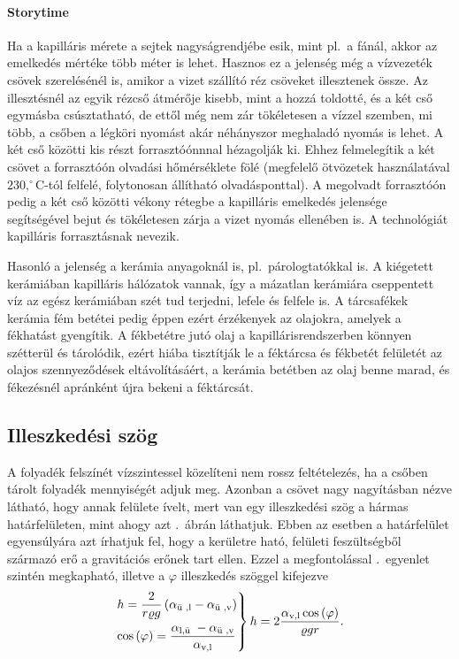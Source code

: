\documentclass[12pt,a4paper]{scrartcl}
\begin{document}
\paragraph{Storytime} Ha a kapilláris mérete a sejtek nagyságrendjébe esik, mint pl.\ a fánál, akkor az emelkedés mértéke több méter is lehet. Hasznos ez a jelenség még a vízvezeték csövek szerelésénél is, amikor a vizet szállító réz csöveket illesztenek össze. Az illesztésnél az egyik rézcső átmérője kisebb, mint a hozzá toldotté, és a két cső egymásba csúsztatható, de ettől még nem zár tökéletesen a vízzel szemben, mi több, a csőben a légköri nyomást akár néhányszor meghaladó nyomás is lehet. A két cső közötti kis részt forrasztóónnnal hézagolják ki. Ehhez felmelegítik a két csövet a forrasztóón olvadási hőmérséklete fölé (megfelelő ötvözetek használatával $230{,}^\circ$C-tól felfelé, folytonosan állítható olvadásponttal). A megolvadt forrasztóón pedig a két cső közötti vékony rétegbe a kapilláris emelkedés jelensége segítségével bejut és tökéletesen zárja a vizet nyomás ellenében is. A technológiát kapilláris forrasztásnak nevezik.

Hasonló a jelenség a kerámia anyagoknál is, pl.\ párologtatókkal is. A kiégetett kerámiában kapilláris hálózatok vannak, így a mázatlan kerámiára cseppentett víz az egész kerámiában szét tud terjedni, lefele és felfele is. A tárcsafékek kerámia fém betétei pedig éppen ezért érzékenyek az olajokra, amelyek a fékhatást gyengítik. A fékbetétre jutó olaj a kapillárisrendszerben könnyen szétterül és tárolódik, ezért hiába tisztítják le a féktárcsa és fékbetét felületét az olajos szennyeződések eltávolításáért, a kerámia betétben az olaj benne marad, és fékezésnél apránként újra bekeni a féktárcsát.
\normalsize

\subsection{Illeszkedési szög}
A folyadék felszínét vízszintessel közelíteni nem rossz feltételezés, ha a csőben tárolt folyadék mennyiségét adjuk meg. Azonban a csövet nagy nagyításban nézve látható, hogy annak felülete ívelt, mert van egy illeszkedési szög a hármas határfelületen, mint ahogy azt .\ ábrán láthatjuk. Ebben az esetben a határfelület egyensúlyára azt írhatjuk fel, hogy a kerületre ható, felületi feszültségből származó erő a gravitációs erőnek tart ellen. Ezzel a megfontolással \az{\eqref{eq:kapillaris_emelkedes}}.\ egyenlet szintén megkapható, illetve a $\varphi$ illeszkedés szöggel kifejezve
\[\left. \begin{gathered}
  h = \frac{2}{{r\varrho g}}\left( {{\alpha _{{\text{ü ,l}}}} - {\alpha _{{\text{ü ,v}}}}} \right) \hfill \\
  \cos {\left( \varphi  \right)}  = \frac{{{\alpha _{{\text{l,ü }}}} - {\alpha _{{\text{ü ,v}}}}}}{{{\alpha _{{\text{v,l}}}}}} \hfill \\ 
\end{gathered}  \right\}h = 2\frac{{{\alpha _{{\text{v,l}}}}\cos \left( \varphi  \right)}}{{\varrho gr}}.\]
\end{document}

